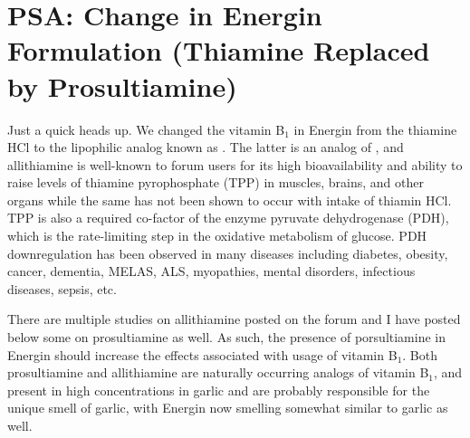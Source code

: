 \chapter{PSA: Change in Energin Formulation (Thiamine Replaced by Prosultiamine)}

\begin{refsection}

Just a quick heads up. We changed the vitamin B$_{1}$ in Energin from the thiamine HCl to the lipophilic analog known as . The latter is an analog of , and allithiamine is well-known to forum users for its high bioavailability and ability to raise levels of thiamine pyrophosphate (TPP) in muscles, brains, and other organs while the same has not been shown to occur with intake of thiamin HCl. TPP is also a required co-factor of the enzyme pyruvate dehydrogenase (PDH), which is the rate-limiting step in the oxidative metabolism of glucose. PDH downregulation has been observed in many diseases including diabetes, obesity, cancer, dementia, MELAS, ALS, myopathies, mental disorders, infectious diseases, sepsis, etc.

There are multiple studies on allithiamine posted on the forum and I have posted below some on prosultiamine as well. As such, the presence of porsultiamine in Energin should increase the effects associated with usage of vitamin B$_{1}$. Both prosultiamine and allithiamine are naturally occurring analogs of vitamin B$_{1}$, and present in high concentrations in garlic and are probably responsible for the unique smell of garlic, with Energin now smelling somewhat similar to garlic as well.\textsuperscript{\cite{urlc24bf378}}

\printbibliography[heading=subbibliography]

\end{refsection}